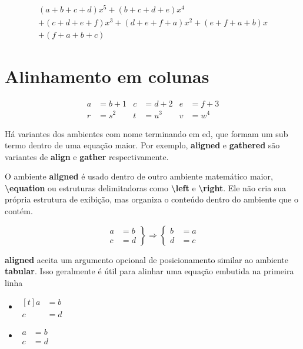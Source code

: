 \documentclass{article}
\begin{document}
\begin{multline}
	(a + b + c + d) x^{5} + (b + c + d + e) x^{4} \\
	+ (c + d + e + f) x^{3} + (d + e + f + a) x^{2} + (e + f + a + b) x\\
	+ (f + a + b + c)
\end{multline}



\section{Alinhamento em colunas}

\begin{align}
	a &= b+1   &  c &= d+2  &  e &= f+3   \\
	r &= s^{2} &  t &=u^{3} &  v &= w^{4}
\end{align}

Há variantes dos ambientes com nome terminando em ed, que formam um sub termo dentro de uma equação maior. Por exemplo, \textbf{aligned} e \textbf{gathered} são variantes de \textbf{align} e \textbf{gather} respectivamente.

O ambiente \textbf{aligned} é usado dentro de outro ambiente matemático maior, \textbf{\textbackslash equation} ou estruturas delimitadoras como \textbf{\textbackslash left} e \textbf{\textbackslash right}. Ele não cria sua própria estrutura de exibição, mas organiza o conteúdo dentro do ambiente que o contém.

\[     %
	\left.     			   %
		\begin{aligned}    %
		a &= b\\
		c &= d
		\end{aligned} 
	\right\}    		   %
	\Longrightarrow
	\left\{      		   %
		\begin{aligned}    %
			b &= a\\
			d &= c
		\end{aligned}
	\right.	   			   %
\]

\textbf{aligned} aceita um argumento opcional de posicionamento similar ao ambiente \textbf{tabular}. Isso geralmente é útil para alinhar uma equação embutida na primeira linha

\begin{itemize}
	\item 
	$\begin{aligned}[t]
		a&=b\\
		c&=d
	\end{aligned}$
	\item 
	$\begin{aligned}
		a&=b\\
		c&=d
	\end{aligned}$
\end{itemize}
\end{document}
